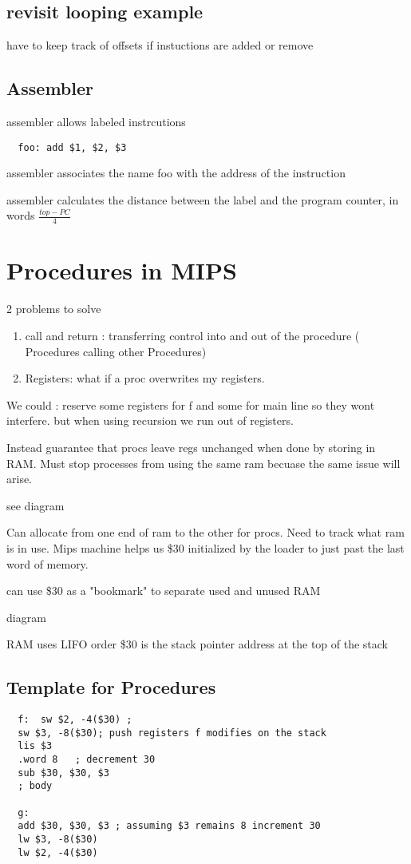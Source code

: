 \documentclass[11pt]{amsart}
\begin{document}
\subsection{revisit looping example}
\par have to keep track of offsets if instuctions are added or remove
\subsection{Assembler}
\par assembler allows labeled instrcutions
\begin{verbatim}
  foo: add $1, $2, $3
\end{verbatim}
\par assembler associates the name foo with the address of the instruction
\par assembler calculates the distance between the label and the program
counter, in words $\frac{top-PC}{4}$
\section{Procedures in MIPS}
\par 2 problems to solve
\begin{enumerate}
  \item call and return : transferring control into and out of the procedure (
    Procedures calling other Procedures)
  \item Registers: what if a proc overwrites my registers.
\end{enumerate}
\par We could : reserve some registers for f and some for main line so they
wont interfere. but when using recursion we run out of registers.
\par Instead guarantee that procs leave regs unchanged when done by storing in
RAM. Must stop processes from using the same ram becuase the same issue will
arise.
\par see diagram
\par Can allocate from one end of ram to the other for procs. Need to track what
ram is in use. Mips machine helps us \$30 initialized by the loader to just
past the last word of memory.
\par can use \$30 as a "bookmark" to separate used and unused RAM
\par diagram
\par RAM uses LIFO order \$30 is the stack pointer address at the top of the
stack
\subsection{Template for Procedures}
\begin{verbatim}
  f:  sw $2, -4($30) ;
  sw $3, -8($30); push registers f modifies on the stack
  lis $3
  .word 8   ; decrement 30
  sub $30, $30, $3
  ; body

  g:
  add $30, $30, $3 ; assuming $3 remains 8 increment 30
  lw $3, -8($30)
  lw $2, -4($30)

\end{verbatim}
\end{document}
